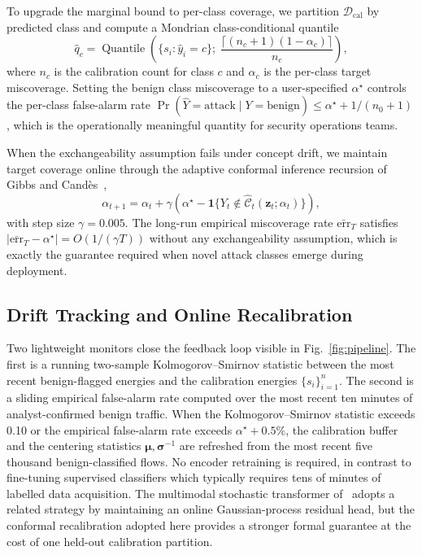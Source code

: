 \documentclass{ieeeaccess}
\DeclareMathOperator{\Quantile}{Quantile}
\begin{document}
To upgrade the marginal bound to per-class coverage, we partition
$\mathcal{D}_\text{cal}$ by predicted class and compute a Mondrian
class-conditional quantile
\begin{equation}
\hat{q}_c = \Quantile\!\left(\{s_i : \hat{y}_i = c\};\; \frac{\lceil(n_c+1)(1-\alpha_c)\rceil}{n_c}\right),
\label{eq:mondrian}
\end{equation}
where $n_c$ is the calibration count for class $c$ and $\alpha_c$ is the
per-class target miscoverage. Setting the benign class miscoverage to a
user-specified $\alpha^\star$ controls the per-class false-alarm rate
$\Pr(\hat{Y}=\text{attack}\mid Y=\text{benign}) \le \alpha^\star + 1/(n_0+1)$,
which is the operationally meaningful quantity for security operations
teams.

When the exchangeability assumption fails under concept drift, we maintain
target coverage online through the adaptive conformal inference recursion
of Gibbs and Cand\`{e}s~\cite{gibbs2021aci},
\begin{equation}
\alpha_{t+1} = \alpha_t + \gamma\!\left(\alpha^\star - \mathbf{1}\!\{Y_t \notin \hat{\mathcal{C}}_t(\mathbf{z}_t;\alpha_t)\}\right),
\label{eq:aci}
\end{equation}
with step size $\gamma = 0.005$. The long-run empirical miscoverage rate
$\bar{\mathrm{err}}_T$ satisfies
$|\bar{\mathrm{err}}_T - \alpha^\star| = O(1/(\gamma T))$ without any
exchangeability assumption, which is exactly the guarantee required when
novel attack classes emerge during deployment.

\subsection{Drift Tracking and Online Recalibration}
\label{sec:method:drift}
Two lightweight monitors close the feedback loop visible in
Fig.~\ref{fig:pipeline}. The first is a running two-sample
Kolmogorov--Smirnov statistic between the most recent benign-flagged
energies and the calibration energies $\{s_i\}_{i=1}^n$. The second is a
sliding empirical false-alarm rate computed over the most recent ten
minutes of analyst-confirmed benign traffic. When the
Kolmogorov--Smirnov statistic exceeds 0.10 or the empirical false-alarm
rate exceeds $\alpha^\star + 0.5\%$, the calibration buffer and the
centering statistics $\bm{\mu}, \bm{\sigma}^{-1}$ are refreshed from the
most recent five thousand benign-classified flows. No encoder retraining
is required, in contrast to fine-tuning supervised classifiers which
typically requires tens of minutes of labelled data acquisition. The
multimodal stochastic transformer of~\cite{anaedevha2025stochmm} adopts a
related strategy by maintaining an online Gaussian-process residual head,
but the conformal recalibration adopted here provides a stronger formal
guarantee at the cost of one held-out calibration partition.
\end{document}
